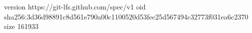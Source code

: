 version https://git-lfs.github.com/spec/v1
oid sha256:3d36d98891c8d561e790a00c1100520d53fec25d567494c32773f031ea6c2370
size 161933
